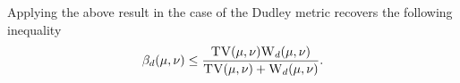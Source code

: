 \begin{example*}
Applying the above result in the case of the  Dudley metric recovers the following inequality~\citep[Proposition 5.1]{sriperumbudur2012empirical} \begin{align*}
    \beta_d(\mu,\nu)\leq \frac{\textsc{TV}(\mu,\nu)\textsc{W}_d(\mu,\nu)}{\textsc{TV}(\mu,\nu)+\textsc{W}_d(\mu,\nu)}.
\end{align*}
\end{example*}





